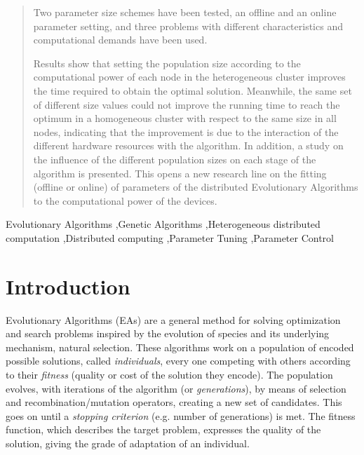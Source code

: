 \documentclass[final,1p,times]{elsarticle}
\begin{document}
\begin{frontmatter}
\begin{abstract}
Two  parameter size schemes have been tested, an offline and an online parameter setting, and three 
problems with different characteristics and computational demands have
been used. 

Results show
that setting the population size according to the computational power
of each node in the heterogeneous cluster improves the time required
to obtain the optimal solution. 
Meanwhile, the same set of
different size values could not improve the running time  to reach the optimum 
 in a homogeneous
cluster with respect to the same size in all nodes, indicating that the improvement is due to the interaction of the different hardware
resources with the algorithm. In addition, a study on the influence of
the different population sizes on each stage of the algorithm is
presented. This opens a new research line on the fitting (offline
or online) of parameters of the distributed Evolutionary Algorithms to the computational power of the devices.





 
\end{abstract}

\begin{keyword}

Evolutionary Algorithms \sep Genetic Algorithms \sep Heterogeneous distributed computation \sep Distributed computing \sep Parameter Tuning \sep Parameter Control

\end{keyword}

\end{frontmatter}

\section{Introduction}
\label{sec:intro}



Evolutionary Algorithms (EAs) are a general method for solving
optimization and search problems inspired by the evolution of species
and its underlying mechanism, natural selection. These algorithms work
on a population of encoded
possible solutions, called {\em individuals}, every one competing with others according to their
{\em fitness} (quality or cost of the solution they encode). The population evolves, with iterations of the algorithm (or {\em generations}), 
by means of selection and recombination/mutation operators, 
creating a new set of candidates. This goes on until a {\em stopping criterion}
(e.g. number of generations) is met. The fitness function, which describes the target problem,  expresses
the quality of the solution, giving the grade of adaptation of an
individual.
\end{document}
